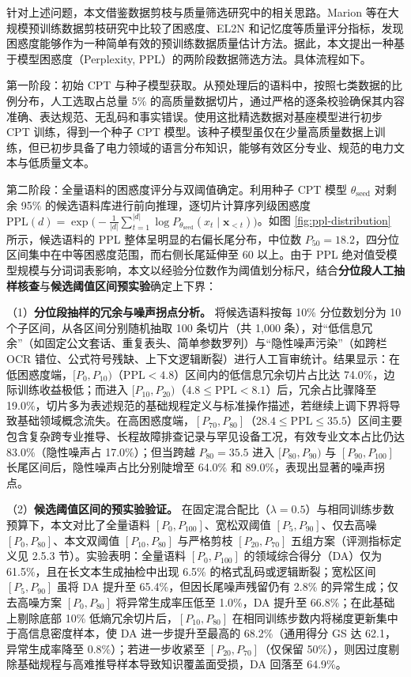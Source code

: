 \documentclass[fontset=fandol,type=master,campus=shenzhen,etitleauto=true]{hithesisbook}
\begin{document}
针对上述问题，本文借鉴数据剪枝与质量筛选研究中的相关思路。Marion 等在大规模预训练数据剪枝研究中比较了困惑度、EL2N 和记忆度等质量评分指标，发现困惑度能够作为一种简单有效的预训练数据质量估计方法\cite{ref58}。据此，本文提出一种基于模型困惑度（Perplexity, PPL）的两阶段数据筛选方法。具体流程如下。

第一阶段：初始 CPT 与种子模型获取。从预处理后的语料中，按照七类数据的比例分布，人工选取占总量 5\% 的高质量数据切片，通过严格的逐条校验确保其内容准确、表达规范、无乱码和事实错误。使用这批精选数据对基座模型进行初步 CPT 训练，得到一个种子 CPT 模型。该种子模型虽仅在少量高质量数据上训练，但已初步具备了电力领域的语言分布知识，能够有效区分专业、规范的电力文本与低质量文本。

第二阶段：全量语料的困惑度评分与双阈值确定。利用种子 CPT 模型 $\theta_{\text{seed}}$ 对剩余 95\% 的候选语料库进行前向推理，逐切片计算序列级困惑度 $\text{PPL}(d) = \exp\bigl(-\frac{1}{|d|}\sum_{t=1}^{|d|} \log P_{\theta_{\text{seed}}}(x_t \mid \mathbf{x}_{<t})\bigr)$。如图 \ref{fig:ppl-distribution} 所示，候选语料的 PPL 整体呈明显的右偏长尾分布，中位数 $P_{50} = 18.2$，四分位区间集中在中等困惑度范围，而右侧长尾延伸至 $60$ 以上。由于 PPL 绝对值受模型规模与分词词表影响，本文以经验分位数作为阈值划分标尺，结合\textbf{分位段人工抽样核查}与\textbf{候选阈值区间预实验}确定上下界：

（1）\textbf{分位段抽样的冗余与噪声拐点分析。} 将候选语料按每 10\% 分位数划分为 10 个子区间，从各区间分别随机抽取 100 条切片（共 1,000 条），对“低信息冗余”（如固定公文套话、重复表头、简单参数罗列）与“隐性噪声污染”（如跨栏 OCR 错位、公式符号残缺、上下文逻辑断裂）进行人工盲审统计。结果显示：在低困惑度端，$[P_0, P_{10})$（$\text{PPL} < 4.8$）区间内的低信息冗余切片占比达 74.0\%，边际训练收益极低；而进入 $[P_{10}, P_{20})$（$4.8 \le \text{PPL} < 8.1$）后，冗余占比骤降至 19.0\%，切片多为表述规范的基础规程定义与标准操作描述，若继续上调下界将导致基础领域概念流失。在高困惑度端，$[P_{70}, P_{80}]$（$28.4 \le \text{PPL} \le 35.5$）区间主要包含复杂跨专业推导、长程故障排查记录与罕见设备工况，有效专业文本占比仍达 83.0\%（隐性噪声占 17.0\%）；但当跨越 $P_{80} = 35.5$ 进入 $[P_{80}, P_{90})$ 与 $[P_{90}, P_{100}]$ 长尾区间后，隐性噪声占比分别陡增至 64.0\% 和 89.0\%，表现出显著的噪声拐点。

（2）\textbf{候选阈值区间的预实验验证。} 在固定混合配比（$\lambda = 0.5$）与相同训练步数预算下，本文对比了全量语料 $[P_0, P_{100}]$、宽松双阈值 $[P_{5}, P_{90}]$、仅去高噪 $[P_0, P_{80}]$、本文双阈值 $[P_{10}, P_{80}]$ 与严格剪枝 $[P_{20}, P_{70}]$ 五组方案（评测指标定义见 2.5.3 节）。实验表明：全量语料 $[P_0, P_{100}]$ 的领域综合得分（DA）仅为 61.5\%，且在长文本生成抽检中出现 6.5\% 的格式乱码或逻辑断裂；宽松区间 $[P_{5}, P_{90}]$ 虽将 DA 提升至 65.4\%，但因长尾噪声残留仍有 2.8\% 的异常生成；仅去高噪方案 $[P_0, P_{80}]$ 将异常生成率压低至 1.0\%，DA 提升至 66.8\%；在此基础上剔除底部 10\% 低熵冗余切片后，$[P_{10}, P_{80}]$ 在相同训练步数内将梯度更新集中于高信息密度样本，使 DA 进一步提升至最高的 68.2\%（通用得分 GS 达 62.1，异常生成率降至 0.8\%）；若进一步收紧至 $[P_{20}, P_{70}]$（仅保留 50\%），则因过度剔除基础规程与高难推导样本导致知识覆盖面受损，DA 回落至 64.9\%。
\end{document}

